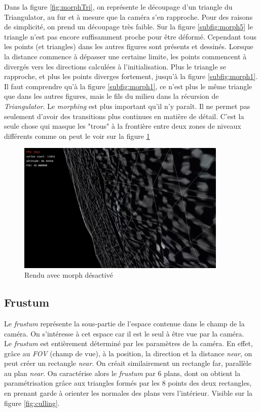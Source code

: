     Dans la figure \ref{fig:morphTri}, on représente le découpage d'un triangle du Triangulator, au fur et à mesure que la caméra s'en rapproche. Pour des raisons de simplicité, on prend un découpage très faible.
    Sur la figure \ref{subfig:morph5} le triangle n'est pas encore suffisamment proche pour être déformé. Cependant tous les points (et triangles) dans les autres figures sont présents et dessinés. 
    Lorsque la distance commence à dépasser une certaine limite, les points commencent à divergés vers les directions calculées à l'initialisation. Plus le triangle se rapproche, et plus les points diverges fortement, jusqu'à la figure \ref{subfig:morph1}. Il faut comprendre qu'à la figure \ref{subfig:morph1}, ce n'est plus le même triangle que dans les autres figures, mais le fils du milieu dans la récursion de \textit{Triangulator}.
    Le \textit{morphing} est plus important qu'il n'y paraît. Il ne permet pas seulement d'avoir des transitions plus continues en matière de détail. C'est la seule chose qui masque les "trous" à la frontière entre deux zones de niveaux différents comme on peut le voir sur la figure \ref{fig:noMorphingHole}
 \begin{figure}[H]
  \centerline{
  \includegraphics[width=10cm]{img/noMorphingHole.png}}
  \caption{Rendu avec morph désactivé}
  \label{fig:noMorphingHole}
  \end{figure}

  
  \subsection{Frustum}
  \label{sec:Frustum}
  
  
  Le \textit{frustum} représente la sous-partie de l'espace contenue dans le champ de la caméra. On s'intéresse à cet espace car il est le seul à être vue par la caméra.\\
 
  Le \emph{frustum} est entièrement déterminé par les paramètres de la caméra.  
  En effet, grâce au \textit{FOV} (champ de vue), à la position, la direction et la distance \emph{near}, on peut créer un rectangle \emph{near}. On créait similairement un rectangle far, parallèle au plan \emph{near}. On caractérise alors le \emph{frustum} par 6 plans, dont on obtient la paramétrisation grâce aux triangles formés par les 8 points des deux rectangles, en prenant garde à orienter les normales des plans vers l'intérieur. Visible sur la figure \ref{fig:culling}.\\
